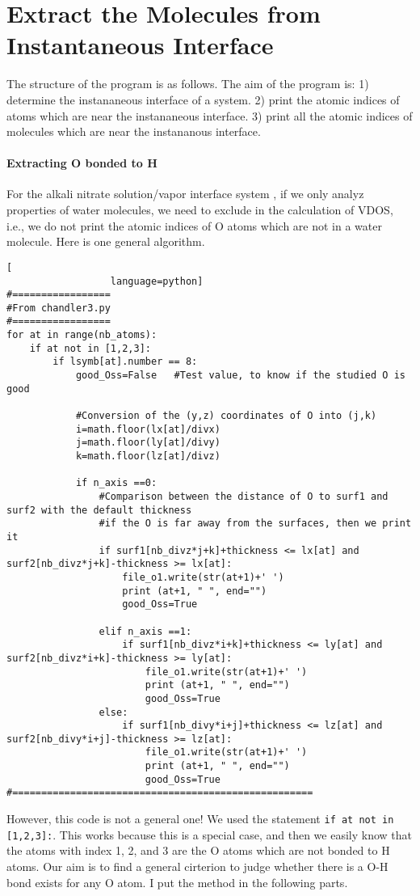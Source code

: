 \section{Extract the Molecules from Instantaneous Interface}
The structure of the program is as follows.
The aim of the program is:
1) determine the instananeous interface of a system.
2) print the atomic indices of atoms which are near the instananeous interface.
3) print all the atomic indices of molecules which are near the instananous interface.

\paragraph{Extracting O bonded to H} \label{Extracting O bonded to H}
For the alkali nitrate solution/vapor interface system , if we only analyz properties of water molecules, we need to exclude \nitrate in the calculation of VDOS, i.e., we do not print the atomic indices of O atoms which are not in a water molecule. Here is one general algorithm. 
\begin{lstlisting}[                                                                                          
                  language=python]
#=================
#From chandler3.py
#=================
for at in range(nb_atoms):
    if at not in [1,2,3]:
        if lsymb[at].number == 8:
            good_Oss=False   #Test value, to know if the studied O is good 

            #Conversion of the (y,z) coordinates of O into (j,k)
            i=math.floor(lx[at]/divx)
            j=math.floor(ly[at]/divy)
            k=math.floor(lz[at]/divz)

            if n_axis ==0:
                #Comparison between the distance of O to surf1 and surf2 with the default thickness
                #if the O is far away from the surfaces, then we print it
                if surf1[nb_divz*j+k]+thickness <= lx[at] and surf2[nb_divz*j+k]-thickness >= lx[at]:
                    file_o1.write(str(at+1)+' ')
                    print (at+1, " ", end="")
                    good_Oss=True

                elif n_axis ==1:
                    if surf1[nb_divz*i+k]+thickness <= ly[at] and  surf2[nb_divz*i+k]-thickness >= ly[at]:
                        file_o1.write(str(at+1)+' ')
                        print (at+1, " ", end="")
                        good_Oss=True
                else:
                    if surf1[nb_divy*i+j]+thickness <= lz[at] and surf2[nb_divy*i+j]-thickness >= lz[at]:
                        file_o1.write(str(at+1)+' ')
                        print (at+1, " ", end="")
                        good_Oss=True
#====================================================
\end{lstlisting}
%
However, this code is not a general one! 
We used the statement \texttt{if at not in [1,2,3]:}. 
This works because this is a special case, and then we easily know 
that the atoms with index 1, 2, and 3 are the O atoms which are not bonded to H atoms. 
Our aim is to find a general cirterion to judge whether there is a O-H bond exists for any O atom. 
I put the method in the following parts.

